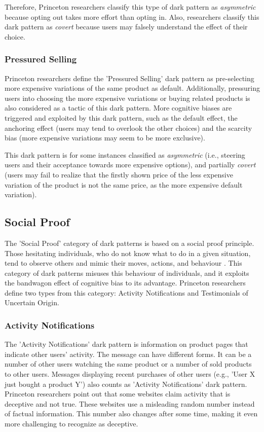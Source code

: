         Therefore, Princeton researchers classify this type of dark pattern as \emph{asymmetric} because opting out takes more effort than opting in. Also, researchers classify this dark pattern as \emph{covert} because users may falsely understand the effect of their choice.
        \subsubsection*{Pressured Selling}
        Princeton researchers define the 'Pressured Selling' dark pattern as pre-selecting more expensive variations of the same product as default. Additionally, pressuring users into choosing the more expensive variations or buying related products is also considered as a tactic of this dark pattern. More cognitive biases are triggered and exploited by this dark pattern, such as the default effect, the anchoring effect (users may tend to overlook the other choices) and the scarcity bias (more expensive variations may seem to be more exclusive).  
        
        This dark pattern is for some instances classified as \emph{asymmetric} (i.e., steering users and their acceptance towards more expensive options), and partially \emph{covert} (users may fail to realize that the firstly shown price of the less expensive variation of the product is not the same price, as the more expensive default variation).
    \subsection{Social Proof}
    The 'Social Proof' category of dark patterns is based on a social proof principle. Those hesitating individuals, who do not know what to do in a given situation, tend to observe others and mimic their moves, actions, and behaviour \cite{influence-cialdini, evilbydesign}. This category of dark patterns misuses this behaviour of individuals, and it exploits the bandwagon effect of cognitive bias to its advantage. Princeton researchers define two types from this category: Activity Notifications and Testimonials of Uncertain Origin.
        \subsubsection*{Activity Notifications}
        The 'Activity Notifications' dark pattern is information on product pages that indicate other users' activity. The message can have different forms. It can be a number of other users watching the same product or a number of sold products to other users. Messages displaying recent purchases of other users (e.g., 'User X just bought a product Y') also counts as 'Activity Notifications' dark pattern. Princeton researchers point out that some websites claim activity that is deceptive and not true. These websites use a misleading random number instead of factual information. This number also changes after some time, making it even more challenging to recognize as deceptive. 
        
